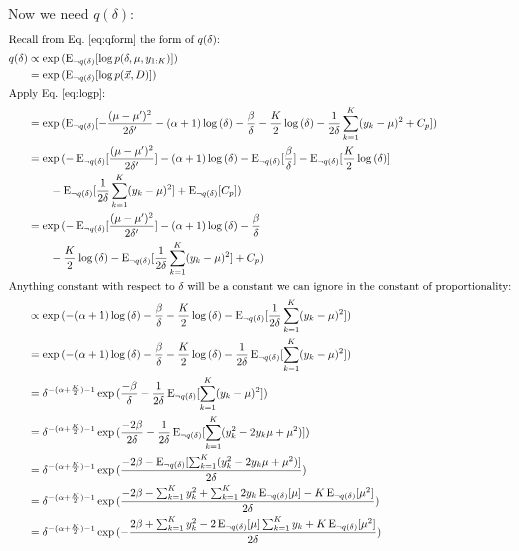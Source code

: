\documentclass[12pt]{article}
\newcommand{\E}{\operatorname{E}}
\begin{document}
Now we need $q(\delta)$:
\begin{align}
    \intertext{Recall from Eq.~\ref{eq:qform} the form of $q(\delta)$:}
    q(\delta) &\propto \exp{(\E_{\neg q(\delta)}[\log p(\delta, \mu, y_{1:K})])}
    \nonumber \\
    &= \exp{(\E_{\neg q(\delta)}[\log p(\vec{x}, D)])}
    \nonumber \\
    \intertext{Apply Eq.~\ref{eq:logp}:}
    &= \exp{(\E_{\neg q(\delta)}[-\frac{(\mu-\mu')^2}{2\delta'}
    - (\alpha+1)\log{(\delta)} - \frac{\beta}{\delta}
    - \frac{K}{2}\log{(\delta)}
    - \frac{1}{2\delta} \sum_{k=1}^{K} (y_{k} - \mu)^2
    + C_p])}
    \nonumber \\
    &= \exp{}(-\E_{\neg q(\delta)}[\frac{(\mu-\mu')^2}{2\delta'}]
    - (\alpha+1)\log{(\delta)} - \E_{\neg
    q(\delta)}[\frac{\beta}{\delta}]
    - \E_{\neg q(\delta)}[\frac{K}{2}\log{(\delta)}]
    \nonumber \\
    &\qquad
    - \E_{\neg q(\delta)}[\frac{1}{2\delta} \sum_{k=1}^{K} (y_{k} - \mu)^2]
    + \E_{\neg q(\delta)}[C_p])
    \nonumber \\
    &= \exp{}(-\E_{\neg q(\delta)}[\frac{(\mu-\mu')^2}{2\delta'}]
    - (\alpha+1)\log{(\delta)} - \frac{\beta}{\delta}
    \nonumber \\
    &\qquad
    - \frac{K}{2}\log{(\delta)}
    - \E_{\neg q(\delta)}[\frac{1}{2\delta} \sum_{k=1}^{K} (y_{k} - \mu)^2]
    + C_p)
    \nonumber \\
    \intertext{Anything constant with respect to $\delta$ will be a constant we can
    ignore in the constant of proportionality:}
    &\propto \exp{(
    - (\alpha+1)\log{(\delta)} - \frac{\beta}{\delta}
    - \frac{K}{2}\log{(\delta)}
    - \E_{\neg q(\delta)}[\frac{1}{2\delta} \sum_{k=1}^{K} (y_{k} - \mu)^2
    ])}
    \nonumber \\
    &= \exp{(
    - (\alpha+1)\log{(\delta)} - \frac{\beta}{\delta}
    - \frac{K}{2}\log{(\delta)}
    - \frac{1}{2\delta} \E_{\neg q(\delta)}[\sum_{k=1}^{K} (y_{k} - \mu)^2
    ])}
    \nonumber \\
    &= \delta^{-(\alpha+\frac{K}{2}) - 1}\exp{(
    \frac{-\beta}{\delta}
    - \frac{1}{2\delta} \E_{\neg q(\delta)}[\sum_{k=1}^{K} (y_{k} - \mu)^2
    ])}
    \nonumber \\
    &= \delta^{-(\alpha+\frac{K}{2}) - 1}\exp{(
    \frac{-2\beta}{2\delta}
    - \frac{1}{2\delta} \E_{\neg q(\delta)}[\sum_{k=1}^{K} (y_{k}^2 -2y_{k}\mu +
    \mu^2)
    ])}
    \nonumber \\
    &= \delta^{-(\alpha+\frac{K}{2}) - 1}\exp{(
    \frac{-2\beta
    - \E_{\neg q(\delta)}[\sum_{k=1}^{K} (y_{k}^2 -2y_{k}\mu +
    \mu^2)]}{2\delta}
    )}
    \nonumber \\
    &= \delta^{-(\alpha+\frac{K}{2}) - 1}\exp{(
    \frac{-2\beta
    - \sum_{k=1}^{K} y_{k}^2 + \sum_{k=1}^{K}2y_{k}
    \E_{\neg q(\delta)}[\mu] - K\E_{\neg q(\delta)}[\mu^2]}{2\delta}
    )}
    \nonumber \\
    &= \delta^{-(\alpha+\frac{K}{2}) - 1}\exp{(
    -\frac{2\beta
    + \sum_{k=1}^{K} y_{k}^2 - 2\E_{\neg q(\delta)}[\mu] \sum_{k=1}^{K}y_{k}
    + K\E_{\neg q(\delta)}[\mu^2]}{2\delta}
    )}
\end{align}
\end{document}
